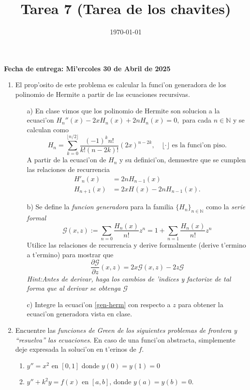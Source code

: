 \documentclass[letterpaper]{article}
\date{\today}
\title{Tarea 7 (Tarea de los chavites)}
\newcommand{\nat}{\ensuremath{ \mathbb N }}
\begin{document}
\maketitle

\textbf{Fecha de entrega: Mi'ercoles 30 de Abril de 2025}

\begin{enumerate}
  \item El prop'osito de este problema es calcular la funci'on generadora de los polinomio de Hermite a partir de las ecuaciones recursivas. 
        \begin{itemize}
          \item[a)] En clase vimos que los polinomio de Hermite son solucion a la ecuaci'on $H_{n}''(x)-2xH_{n}(x)+2nH_{n}(x)=0,$ para cada $n\in\nat$ y se calculan como
\[
      H_{n}=\sum_{k=0}^{\lfloor n/2\rfloor}\frac{(-1)^{k}n!}{k!(n-2k)!}(2x)^{n-2k},\quad\lfloor\cdot\rfloor\text{ es la funci'on piso.}
\]
          A partir de la ecuaci'on de $H_{n}$ y su definici'on, demuestre que se cumplen las relaciones de recurrencia
          \begin{align*}
            H'_{n}(x)&=2nH_{n-1}(x)\\
            H_{n+1}(x)&=2xH_{}(x)-2nH_{n-1}(x).
          \end{align*}      
          \item[b)] Se define la \emph{funcion generadora} para la familia $\{H_{n}\}_{n\in\nat}$ como la \emph{serie formal}
          \[
                \mathcal{G}(x,z):=\sum_{n=0}\frac{H_{n}(x)}{n!}z^{n}=1+\sum_{n=1}\frac{H_{n}(x)}{n!}z^{n}
          \]
                Utilice las relaciones de recurrencia y derive formalmente (derive t'ermino a t'ermino) para mostrar que
          \begin{equation}\label{gen-herm}
                \dfrac{\partial\mathcal{G}}{\partial z}(x,z)=2x\mathcal{G}(x,z)-2z\mathcal{G}
          \end{equation}
                \emph{Hint:Antes de derivar, haga los cambios de 'indices y factorize de tal forma que al derivar se obtenga $\mathcal{G}$}
          \item[c)] Integre la ecuaci'on \ref{gen-herm} con respecto a $z$ para obtener la ecuaci'on generadora vista en clase.
        \end{itemize}
  \item Encuentre las \emph{funciones de Green de los siguientes problemas de frontera y ``resuelva'' las ecuaciones}. En caso de una funci'on abstracta, simplemente deje expresada la soluci'on en t'erinos de $f$. 
        \begin{enumerate}
          \item $y''=x^{2}$ en $[0,1]$ donde $y(0)=y(1)=0$
          \item $y''+k^{2}y=f(x)$ en $[a,b]$, donde $y(a)=y(b)=0$.
        \end{enumerate}
\end{enumerate}
\end{document}
